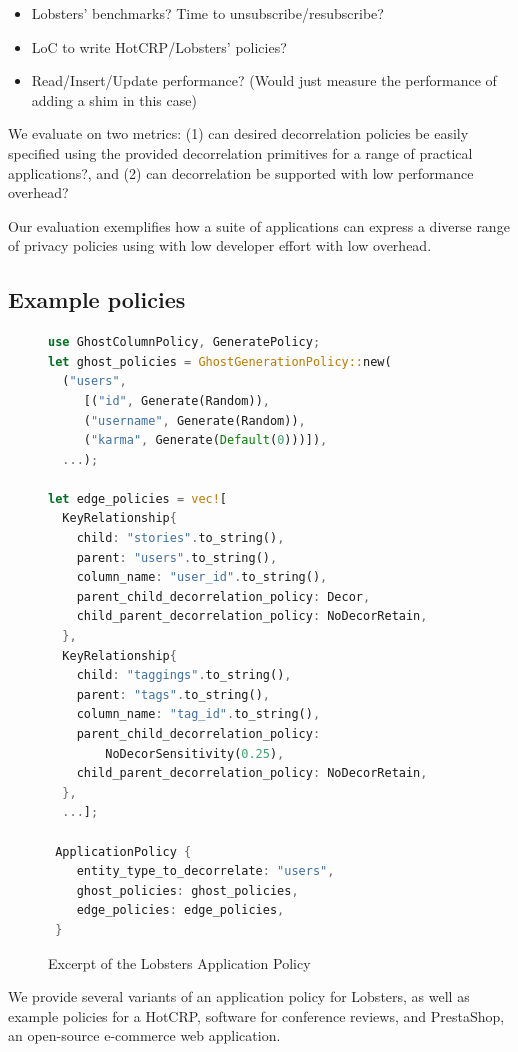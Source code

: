 \begin{itemize}
    \item Lobsters' benchmarks? Time to unsubscribe/resubscribe?
    \item LoC to write HotCRP/Lobsters' policies?
    \item Read/Insert/Update performance? (Would just measure the performance of adding a shim in
        this case)
\end{itemize}

\iffalse
We evaluate \sys on two metrics: (1) can desired decorrelation policies be easily specified using the
provided decorrelation primitives for a range of practical applications?, and (2) can decorrelation
be supported with low performance overhead?

Our evaluation exemplifies how a suite of applications can express a diverse
range of privacy policies using \sys with low developer effort with low overhead.

\subsection{Example policies}
\begin{figure}
\begin{lstlisting}[language=Rust]
use GhostColumnPolicy, GeneratePolicy;
let ghost_policies = GhostGenerationPolicy::new(
  ("users", 
     [("id", Generate(Random)),
     ("username", Generate(Random)),
     ("karma", Generate(Default(0)))]),
  ...);

let edge_policies = vec![
  KeyRelationship{
    child: "stories".to_string(),
    parent: "users".to_string(),
    column_name: "user_id".to_string(),
    parent_child_decorrelation_policy: Decor,
    child_parent_decorrelation_policy: NoDecorRetain,
  },
  KeyRelationship{
    child: "taggings".to_string(),
    parent: "tags".to_string(),
    column_name: "tag_id".to_string(),
    parent_child_decorrelation_policy: 
        NoDecorSensitivity(0.25),
    child_parent_decorrelation_policy: NoDecorRetain,
  },
  ...];

 ApplicationPolicy {
    entity_type_to_decorrelate: "users",
    ghost_policies: ghost_policies,
    edge_policies: edge_policies,
 }
\end{lstlisting}
    \label{fig:policy}
    \caption{Excerpt of the Lobsters Application Policy}
\end{figure}
We provide several variants of an application policy for Lobsters, as well as example policies for a
HotCRP, software for conference reviews, and PrestaShop, an
open-source e-commerce web application.


